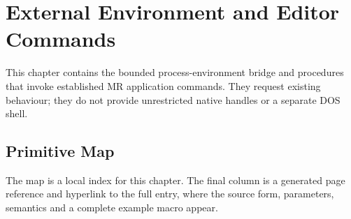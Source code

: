 \documentclass[a4paper,10pt,twoside,openany]{book}
\begin{document}
\chapter{External Environment and Editor Commands}

This chapter contains the bounded process-environment bridge and procedures that invoke established MR application commands. They request existing behaviour; they do not provide unrestricted native handles or a separate DOS shell.

\section{Primitive Map}
The map is a local index for this chapter. The final column is a generated page
reference and hyperlink to the full entry, where the source form, parameters,
semantics and a complete example macro appear.
\end{document}
